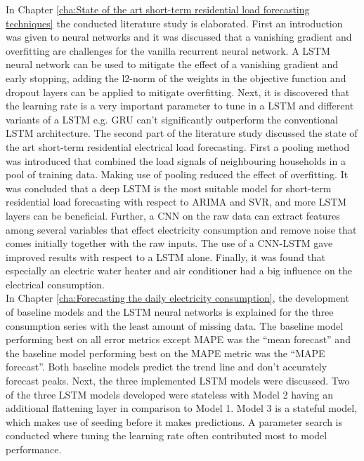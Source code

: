 In Chapter \ref{cha:State of the art short-term residential load forecasting techniques} the conducted literature study is elaborated. First an introduction was given to neural networks and it was discussed that a vanishing gradient and overfitting are challenges for the vanilla recurrent neural network. A LSTM neural network can be used to mitigate the effect of a vanishing gradient and early stopping, adding the l2-norm of the weights in the objective function and dropout layers can be applied to mitigate overfitting. Next, it is discovered that the learning rate is a very important parameter to tune in a LSTM and different variants of a LSTM e.g. GRU can't significantly outperform the conventional LSTM architecture. The second part of the literature study discussed the state of the art short-term residential electrical load forecasting. First a pooling method was introduced that combined the load signals of neighbouring households in a pool of training data. Making use of pooling reduced the effect of overfitting. It was concluded that a deep LSTM is the most suitable model for short-term residential load forecasting with respect to ARIMA and SVR, and more LSTM layers can be beneficial. Further, a CNN on the raw data can extract features among several variables that effect electricity consumption and remove noise that comes initially together with the raw inputs. The use of a CNN-LSTM gave improved results with respect to a LSTM alone. Finally, it was found that especially an electric water heater and air conditioner had a big influence on the electrical consumption.\\

In Chapter \ref{cha:Forecasting the daily electricity consumption}, the development of baseline models and the LSTM neural networks is explained for the three consumption series with the least amount of missing data. The baseline model performing best on all error metrics except MAPE was the ``mean forecast'' and the baseline model performing best on the MAPE metric was the ``MAPE forecast''. Both baseline models predict the trend line and don't accurately forecast peaks. Next, the three implemented LSTM models were discussed. Two of the three LSTM models developed were stateless with Model 2 having an additional flattening layer in comparison to Model 1. Model 3 is a stateful model, which makes use of seeding before it makes predictions. A parameter search is conducted where tuning the learning rate often contributed most to model performance.\\

